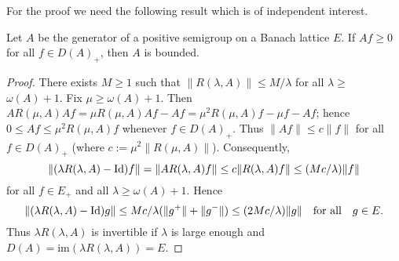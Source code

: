 For the proof we need the following result which is of independent interest.

\begin{lemma}\label{lem:c2-4.18}
Let $A$ be the generator of a positive semigroup on a Banach lattice $E$. 
If $Af \geq 0$ for all $f \in D(A)_{+}$, then $A$ is bounded.
\end{lemma}

\begin{proof}
There exists $M \geq 1$ such that $\|R(\lambda,A)\| \leq M/\lambda$ for all $\lambda \geq$ $\omega(A)+1$.
Fix $\mu \geq \omega(A)+1$.
Then $AR(\mu,A)Af = \mu R(\mu,A)Af - Af = \mu^{2}R(\mu,A)f - \mu f - Af$; hence $0 \leq Af \leq \mu^{2}R(\mu,A)f$ whenever $f \in D(A)_{+}$.
Thus $\|Af\| \leq c\|f\|$ for all $f \in D(A)_{+}$ (where $c := \mu^{2}\|R(\mu,A)\|$).
Consequently,
\[
\|(\lambda R(\lambda,A) - \operatorname{Id})f\| = \|AR(\lambda,A)f\| \leq c\|R(\lambda,A)f\| \leq (Mc/\lambda)\|f\| 
\]
for all $f \in E_{+}$ and all $ \lambda \geq \omega(A)+1$. 
Hence
\[
\|(\lambda R(\lambda,A) - \operatorname{Id})g\| \leq Mc/\lambda(\|g^{+}\| + \|g^{-}\|) \leq (2Mc/\lambda)\|g\| \quad \text{for all} \quad g \in E.
\]
Thus $\lambda R(\lambda,A)$ is invertible if $\lambda$ is large enough and
$D(A) = \text{im}(\lambda R(\lambda,A)) = E$.
\end{proof}

